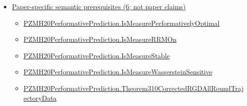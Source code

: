 \documentclass[10pt]{article}
\begin{document}
\begin{itemize}[leftmargin=1.2em]
\begin{itemize}[leftmargin=1.2em]
\item \hyperlink{library-prerequisite-555f831d5bfa2a27}{Applied\allowbreak{}Modeling\allowbreak{}Lib.\allowbreak{}Measure\allowbreak{}Performative\allowbreak{}Model\allowbreak{}On.\allowbreak{}Is\allowbreak{}Performatively\allowbreak{}Optimal}
\item \hyperlink{library-prerequisite-4af6c70f954a80a0}{Applied\allowbreak{}Modeling\allowbreak{}Lib.\allowbreak{}Measure\allowbreak{}Performative\allowbreak{}Model\allowbreak{}On.\allowbreak{}Is\allowbreak{}Performatively\allowbreak{}Stable}
\item \hyperlink{library-prerequisite-eb9ab8e4235e1d28}{Applied\allowbreak{}Modeling\allowbreak{}Lib.\allowbreak{}Measure\allowbreak{}Performative\allowbreak{}Model\allowbreak{}On.\allowbreak{}Is\allowbreak{}Pointwise\allowbreak{}Gradient\allowbreak{}Strongly\allowbreak{}Convex}
\item \hyperlink{library-prerequisite-0e1e192eee739a4b}{Applied\allowbreak{}Modeling\allowbreak{}Lib.\allowbreak{}Measure\allowbreak{}Performative\allowbreak{}Model\allowbreak{}On.\allowbreak{}Is\allowbreak{}Wasserstein\allowbreak{}Sensitive}
\item \hyperlink{library-prerequisite-d4de05e57b5947f0}{Applied\allowbreak{}Modeling\allowbreak{}Lib.\allowbreak{}measure\allowbreak{}Decoupled\allowbreak{}Performative\allowbreak{}Risk}
\end{itemize}
\item \hyperlink{paper-prerequisite-section-5ef5ef0364b6939c}{Paper-specific semantic prerequisites (6; not paper claims)}
\begin{itemize}[leftmargin=1.2em]
\item \hyperlink{paper-prerequisite-48fa8b1c1ddbaa9c}{PZMH20\allowbreak{}Performative\allowbreak{}Prediction.\allowbreak{}Is\allowbreak{}Measure\allowbreak{}Performatively\allowbreak{}Optimal}
\item \hyperlink{paper-prerequisite-28cbc41dc9d12634}{PZMH20\allowbreak{}Performative\allowbreak{}Prediction.\allowbreak{}Is\allowbreak{}Measure\allowbreak{}RRM\allowbreak{}On}
\item \hyperlink{paper-prerequisite-f6b3bb0ef1cf7d32}{PZMH20\allowbreak{}Performative\allowbreak{}Prediction.\allowbreak{}Is\allowbreak{}Measure\allowbreak{}Stable}
\item \hyperlink{paper-prerequisite-2ea2f5769822c5c4}{PZMH20\allowbreak{}Performative\allowbreak{}Prediction.\allowbreak{}Is\allowbreak{}Measure\allowbreak{}Wasserstein\allowbreak{}Sensitive}
\item \hyperlink{paper-prerequisite-5a443fd08b184a8b}{PZMH20\allowbreak{}Performative\allowbreak{}Prediction.\allowbreak{}Theorem310\allowbreak{}Corrected\allowbreak{}RGD\allowbreak{}All\allowbreak{}Round\allowbreak{}Trajectory\allowbreak{}Data}

\end{itemize}
\end{itemize}
\end{document}
